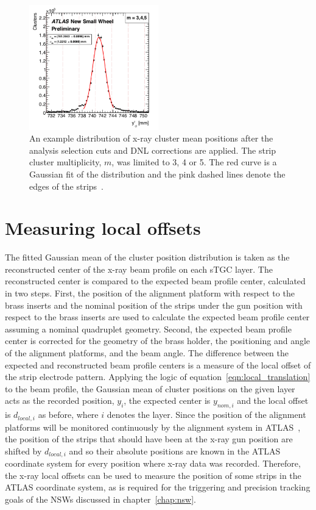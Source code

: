 \begin{figure}[t]
    \centering
    \includegraphics[width = 0.5\textwidth]{figures/figure_xray_beam_profile.pdf}
    \caption{An example distribution of x-ray cluster mean positions after the analysis selection cuts and DNL corrections are applied. The strip cluster multiplicity, $m$, was limited to 3, 4 or 5. The red curve is a Gaussian fit of the distribution and the pink dashed lines denote the edges of the strips~\cite{lefebvre_precision_2020}.}
    \label{fig:xray_beam_profile}
\end{figure}

\section{Measuring local offsets}
The fitted Gaussian mean of the cluster position distribution is taken as the reconstructed center of the x-ray beam profile on each sTGC layer. The reconstructed center is compared to the expected beam profile center, calculated in two steps. First, the position of the alignment platform with respect to the brass inserts and the nominal position of the strips under the gun position with respect to the brass inserts are used to calculate the expected beam profile center assuming a nominal quadruplet geometry. Second, the expected beam profile center is corrected for the geometry of the brass holder, the positioning and angle of the alignment platforms, and the beam angle. The difference between the expected and reconstructed beam profile centers is a measure of the local offset of the strip electrode pattern. Applying the logic of equation~\ref{eqn:local_translation} to the beam profile, the Gaussian mean of cluster positions on the given layer acts as the recorded position, $y_i$, the expected center is $y_{nom, i}$ and the local offset is $d_{local, i}$ as before, where $i$ denotes the layer. Since the position of the alignment platforms will be monitored continuously by the alignment system in ATLAS~\cite{nsw_tdr}, the position of the strips that should have been at the x-ray gun position are shifted by $d_{local, i}$ and so their absolute positions are known in the ATLAS coordinate system for every position where x-ray data was recorded. Therefore, the x-ray local offsets can be used to measure the position of some strips in the ATLAS coordinate system, as is required for the triggering and precision tracking goals of the NSWs discussed in chapter~\ref{chap:nsw}.

